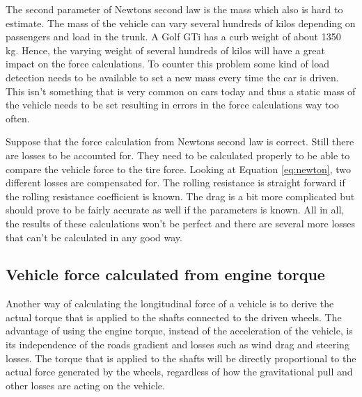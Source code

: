 The second parameter of Newtons second law is the mass which also is hard to estimate. The mass of the vehicle can vary several hundreds of kilos depending on passengers and load in the trunk. A Golf GTi has a curb weight of about 1350 kg. Hence, the varying weight of several hundreds of kilos will have a great impact on the force calculations. To counter this problem some kind of load detection needs to be available to set a new mass every time the car is driven. This isn't something that is very common on cars today and thus a static mass of the vehicle needs to be set resulting in errors in the force calculations way too often.

Suppose that the force calculation from Newtons second law is correct. Still there are losses to be accounted for. They need to be calculated properly to be able to compare the vehicle force to the tire force. Looking at Equation \ref{eq:newton}, two different losses are compensated for. The rolling resistance is straight forward if the rolling resistance coefficient is known. The drag is a bit more complicated but should prove to be fairly accurate as well if the parameters is known. All in all, the results of these calculations won't be perfect and there are several more losses that can't be calculated in any good way. 


\subsection{Vehicle force calculated from engine torque}
Another way of calculating the longitudinal force of a vehicle is to derive the actual torque that is applied to the shafts connected to the driven wheels. The advantage of using the engine torque, instead of the acceleration of the vehicle, is its independence of the roads gradient and losses such as wind drag and steering losses. The torque that is applied to the shafts will be directly proportional to the actual force generated by the wheels, regardless of how the gravitational pull and other losses are acting on the vehicle. 


